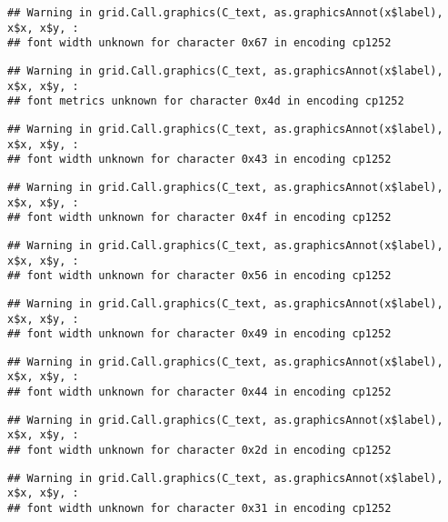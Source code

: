 \documentclass[
]{article}
\begin{document}
\begin{verbatim}
## Warning in grid.Call.graphics(C_text, as.graphicsAnnot(x$label), x$x, x$y, :
## font width unknown for character 0x67 in encoding cp1252
\end{verbatim}

\begin{verbatim}
## Warning in grid.Call.graphics(C_text, as.graphicsAnnot(x$label), x$x, x$y, :
## font metrics unknown for character 0x4d in encoding cp1252
\end{verbatim}

\begin{verbatim}
## Warning in grid.Call.graphics(C_text, as.graphicsAnnot(x$label), x$x, x$y, :
## font width unknown for character 0x43 in encoding cp1252
\end{verbatim}

\begin{verbatim}
## Warning in grid.Call.graphics(C_text, as.graphicsAnnot(x$label), x$x, x$y, :
## font width unknown for character 0x4f in encoding cp1252
\end{verbatim}

\begin{verbatim}
## Warning in grid.Call.graphics(C_text, as.graphicsAnnot(x$label), x$x, x$y, :
## font width unknown for character 0x56 in encoding cp1252
\end{verbatim}

\begin{verbatim}
## Warning in grid.Call.graphics(C_text, as.graphicsAnnot(x$label), x$x, x$y, :
## font width unknown for character 0x49 in encoding cp1252
\end{verbatim}

\begin{verbatim}
## Warning in grid.Call.graphics(C_text, as.graphicsAnnot(x$label), x$x, x$y, :
## font width unknown for character 0x44 in encoding cp1252
\end{verbatim}

\begin{verbatim}
## Warning in grid.Call.graphics(C_text, as.graphicsAnnot(x$label), x$x, x$y, :
## font width unknown for character 0x2d in encoding cp1252
\end{verbatim}

\begin{verbatim}
## Warning in grid.Call.graphics(C_text, as.graphicsAnnot(x$label), x$x, x$y, :
## font width unknown for character 0x31 in encoding cp1252
\end{verbatim}
\end{document}
